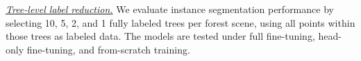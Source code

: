 \documentclass[review,authoryear]{elsarticle}
\begin{document}

\textit{\underline{Tree-level label reduction.}} We evaluate instance segmentation performance by selecting 10, 5, 2, and 1 fully labeled trees per forest scene, using all points within those trees as labeled data. The models are tested under full fine-tuning, head-only fine-tuning, and from-scratch training. 
\end{document}

